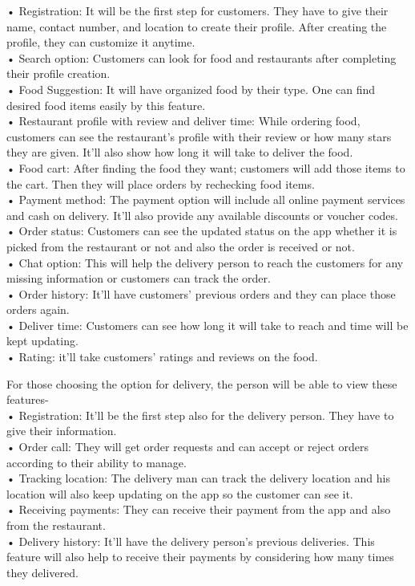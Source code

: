 \documentclass[letterpaper]{report}
\begin{document}
•	Registration:  It will be the first step for customers. They have to give their name, contact number, and location to create their profile. After creating the profile, they can customize it anytime.\\
•	Search option: Customers can look for food and restaurants after completing their profile creation.\\
•	Food Suggestion: It will have organized food by their type. One can find desired food items easily by this feature.\\
•	Restaurant profile with review and deliver time: While ordering food, customers can see the restaurant's profile with their review or how many stars they are given. It’ll also show how long it will take to deliver the food.\\
•	Food cart: After finding the food they want; customers will add those items to the cart. Then they will place orders by rechecking food items.\\
•	Payment method: The payment option will include all online payment services and cash on delivery. It’ll also provide any available discounts or voucher codes.\\
•	Order status: Customers can see the updated status on the app whether it is picked from the restaurant or not and also the order is received or not.\\
•	Chat option: This will help the delivery person to reach the customers for any missing information or customers can track the order.\\
•	Order history: It’ll have customers' previous orders and they can place those orders again.\\
•	Deliver time: Customers can see how long it will take to reach and time will be kept updating.\\
•	Rating: it’ll take customers' ratings and reviews on the food.
\\
\newpage

For those choosing the option for delivery, the person will be able to view these features-\\
•	Registration: It’ll be the first step also for the delivery person. They have to give their information.\\
•	Order call: They will get order requests and can accept or reject orders according to their ability to manage.\\
•	Tracking location: The delivery man can track the delivery location and his location will also keep updating on the app so the customer can see it.\\
•	Receiving payments: They can receive their payment from the app and also from the restaurant.\\
•	Delivery history: It’ll have the delivery person’s previous deliveries. This feature will also help to receive their payments by considering how many times they delivered.\\
\end{document}
